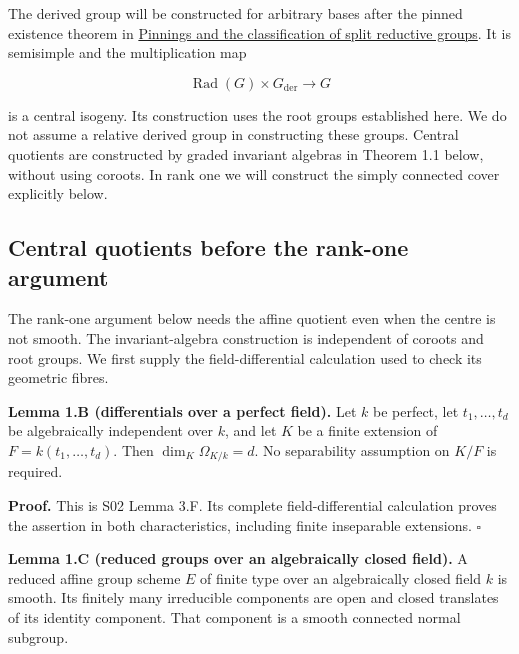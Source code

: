 \documentclass[11pt,a4paper,openany]{report}
\begin{document}
The derived group will be constructed for arbitrary bases after the pinned existence theorem in \href{https://github.com/KokunoYumeto/open-math-courses/blob/main/docs/courses/AG-RG/AG-RG-05.md\#the-derived-group}{Pinnings and the classification of split reductive groups}. It is semisimple and the multiplication map

\[
\operatorname{Rad}(G)\times G_{\mathrm{der}}\longrightarrow G
\]

is a central isogeny. Its construction uses the root groups established here. We do not assume a relative derived group in constructing these groups. Central quotients are constructed by graded invariant algebras in Theorem 1.1 below, without using coroots. In rank one we will construct the simply connected cover explicitly below.

\subsection{Central quotients before the rank-one argument}\label{AG-RG-03-central-quotients-before-the-rank-one-argument}

The rank-one argument below needs the affine quotient even when the centre is not smooth. The invariant-algebra construction is independent of coroots and root groups. We first supply the field-differential calculation used to check its geometric fibres.

\textbf{Lemma 1.B (differentials over a perfect field).} Let \(k\) be perfect, let \(t_1,\ldots,t_d\) be algebraically independent over \(k\), and let \(K\) be a finite extension of \(F=k(t_1,\ldots,t_d)\). Then \(\dim_K\Omega_{K/k}=d\). No separability assumption on \(K/F\) is required.

\textbf{Proof.} This is S02 Lemma 3.F. Its complete field-differential calculation proves the assertion in both characteristics, including finite inseparable extensions. \(\square\)

\textbf{Lemma 1.C (reduced groups over an algebraically closed field).} A reduced affine group scheme \(E\) of finite type over an algebraically closed field \(k\) is smooth. Its finitely many irreducible components are open and closed translates of its identity component. That component is a smooth connected normal subgroup.
\end{document}

